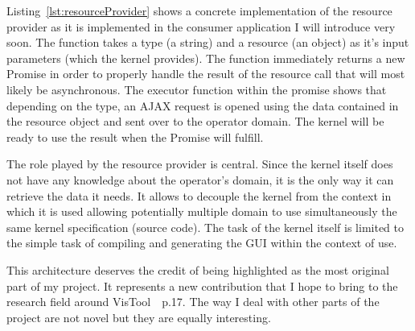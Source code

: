 Listing~\ref{lst:resourceProvider} shows a concrete implementation of the resource provider as it is implemented in the consumer application I will introduce very soon. The function takes a type (a string) and a resource (an object) as it's input parameters (which the kernel provides). The function immediately returns a new Promise in order to properly handle the result of the resource call that will most likely be asynchronous. The executor function within the promise shows that depending on the type, an AJAX request is opened using the data contained in the resource object and sent over to the operator domain. The kernel will be ready to use the result when the Promise will fulfill.

The role played by the resource provider is central. Since the kernel itself does not have any knowledge about the operator's domain, it is the only way it can retrieve the data it needs. It allows to decouple the kernel from the context in which it is used allowing potentially multiple domain to use simultaneously the same kernel specification (source code). The task of the kernel itself is limited to the simple task of compiling and generating the GUI within the context of use.

This architecture deserves the credit of being highlighted as the most original part of my project. It represents a new contribution that I hope to bring to the research field around VisTool~\cite{lauesen2009}~p.17. The way I deal with other parts of the project are not novel but they are equally interesting.